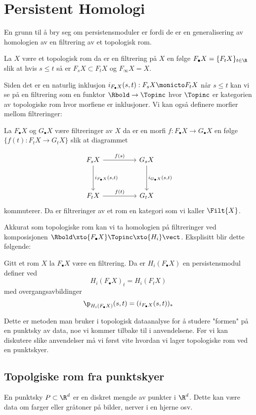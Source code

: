 \section{Persistent Homologi}
En grunn til å bry seg om persistensmoduler er fordi de er en generalisering av homologien av en filtrering av et topologisk rom.
\begin{definition}\label{Def:Filt}
    La $X$ være et topologisk rom da er en filtrering på $X$ en følge $F_\bullet X = \{F_tX\}_{t\in\R}$ slik at hvis $s\leq t$ så er $F_sX\subset F_tX$ og $F_\infty X=X$.
\end{definition}
Siden det er en naturlig inklusjon $i_{F_\bullet X}(s,t): F_sX\monicto F_tX$ når $s\leq t$ kan vi se på en filtrering som en funktor $\Rbold\to\Topinc$ hvor $\Topinc$ er kategorien av topologiske rom hvor morfiene er inklusjoner. Vi kan også definere morfier mellom filtreringer:

La $F_\bullet X$ og $G_\bullet X$ være filtreringer av $X$ da er en morfi $f: F_\bullet X\to G_\bullet X$ en følge $\{f(t): F_tX\to G_tX\}$ slik at diagrammet

\[
\begin{tikzcd}
	{F_sX} && {G_sX} \\
	\\
	{F_tX} && {G_tX}
	\arrow["{f(s)}", from=1-1, to=1-3]
	\arrow["{i_{F_\bullet X}(s,t)}", from=1-1, to=3-1]
	\arrow["{i_{G_\bullet X}(s,t)}", from=1-3, to=3-3]
	\arrow["{f(t)}", from=3-1, to=3-3]
\end{tikzcd}
\]
kommuterer. Da er filtreringer av et rom en kategori som vi kaller $\Filt{X}$.

Akkurat som topologiske rom kan vi ta homologien på filtreringer ved komposisjonen $\Rbold\xto{F_\bullet X}\Topinc\xto{H_i}\vect$. Eksplisitt blir dette følgende:

Gitt et rom $X$ la $F_\bullet X$ være en filtrering. Da er $H_i(F_\bullet X)$ en persistensmodul definer ved
\[H_i(F_\bullet X)_t = H_i(F_tX)\]
med overgangsavbildinger
\[\p_{H_i(F_\bullet X)}(s,t) = (i_{F_\bullet X}(s,t))_*\]

Dette er metoden man bruker i topologisk dataanalyse for å studere "formen" på en punktsky av data, noe vi kommer tilbake til i anvendelsene. Før vi kan diskutere slike anvendelser må vi først vite hvordan vi lager topologiske rom ved en punktskyer.

\subsection{Topolgiske rom fra punktskyer}
En punktsky $P\subset\R^d$ er en diskret mengde av punkter i $\R^d$. Dette kan være data om farger eller gråtoner på bilder, nerver i en hjerne osv. 


